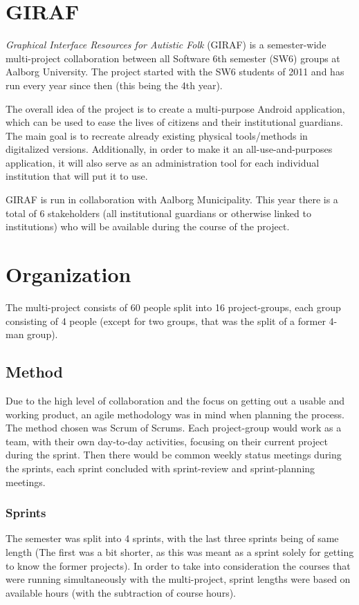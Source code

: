 \section{GIRAF}

\textit{Graphical Interface Resources for Autistic Folk} (GIRAF) is a semester-wide multi-project collaboration between all Software 6th semester (SW6) groups at Aalborg University.
The project started with the SW6 students of 2011 and has run every year since then (this being the 4th year).

The overall idea of the project is to create a multi-purpose Android application, which can be used to ease the lives of citizens and their institutional guardians.
The main goal is to recreate already existing physical tools/methods in digitalized versions.
Additionally, in order to make it an all-use-and-purposes application, it will also serve as an administration tool for each individual institution that will put it to use.

GIRAF is run in collaboration with Aalborg Municipality.
This year there is a total of 6 stakeholders (all institutional guardians or otherwise linked to institutions) who will be available during the course of the project.

\section{Organization}
The multi-project consists of 60 people split into 16 project-groups, each group consisting of 4 people (except for two groups, that was the split of a former 4-man group).

\subsection{Method}
Due to the high level of collaboration and the focus on getting out a usable and working product, an agile methodology was in mind when planning the process.
The method chosen was Scrum of Scrums.
Each project-group would work as a team, with their own day-to-day activities, focusing on their current project during the sprint.
Then there would be common weekly status meetings during the sprints, each sprint concluded with sprint-review and sprint-planning meetings.

\subsubsection{Sprints}
The semester was split into 4 sprints, with the last three sprints being of same length (The first was a bit shorter, as this was meant as a sprint solely for getting to know the former projects).
In order to take into consideration the courses that were running simultaneously with the multi-project, sprint lengths were based on available hours (with the subtraction of course hours).

